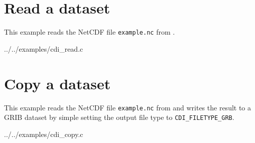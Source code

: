 \section{Read a dataset}

This example reads the NetCDF file \texttt{example.nc} from .


{../../examples/cdi_read.c}


\section{Copy a dataset}

This example reads the NetCDF file \texttt{example.nc} from 
and writes the result to a GRIB dataset by simple setting the output file type
to \texttt{CDI\_FILETYPE\_GRB}.


{../../examples/cdi_copy.c}
